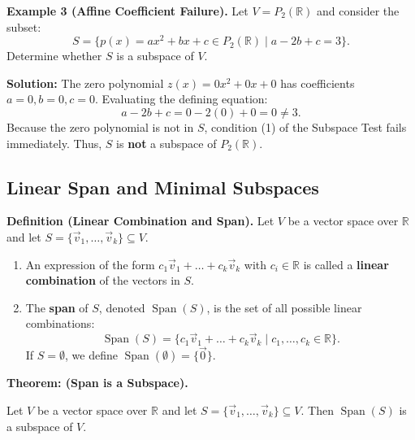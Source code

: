 \medskip
\noindent\textbf{Example 3 (Affine Coefficient Failure).} 
Let $V = P_2(\mathbb{R})$ and consider the subset:
\[
S = \{ p(x) = ax^2 + bx + c \in P_2(\mathbb{R}) \mid a - 2b + c = 3 \}.
\]
Determine whether $S$ is a subspace of $V$.

\medskip
\noindent\textbf{Solution:} 
The zero polynomial $z(x) = 0x^2 + 0x + 0$ has coefficients $a = 0, b = 0, c = 0$. Evaluating the defining equation:
\[
a - 2b + c = 0 - 2(0) + 0 = 0 \neq 3.
\]
Because the zero polynomial is not in $S$, condition (1) of the Subspace Test fails immediately. Thus, $S$ is \textbf{not} a subspace of $P_2(\mathbb{R})$.


\subsection{Linear Span and Minimal Subspaces}

\noindent\textbf{Definition (Linear Combination and Span).} 
Let $V$ be a vector space over $\mathbb{R}$ and let $S = \{\vec{v}_1, \dots, \vec{v}_k\} \subseteq V$. 
\begin{enumerate}[itemsep=0.8em, topsep=0.5em]
    \item An expression of the form $c_1\vec{v}_1 + \dots + c_k\vec{v}_k$ with $c_i \in \mathbb{R}$ is called a \textbf{linear combination} of the vectors in $S$.
    \item The \textbf{span} of $S$, denoted $\operatorname{Span}(S)$, is the set of all possible linear combinations:
    \[
    \operatorname{Span}(S) = \{ c_1\vec{v}_1 + \dots + c_k\vec{v}_k \mid c_1, \dots, c_k \in \mathbb{R} \}.
    \]
    If $S = \emptyset$, we define $\operatorname{Span}(\emptyset) = \{\vec{0}\}$.
\end{enumerate}

\medskip

\noindent\textbf{Theorem: (Span is a Subspace).}

Let $V$ be a vector space over $\mathbb{R}$ and let $S = \{\vec{v}_1, \dots, \vec{v}_k\} \subseteq V$. Then $\operatorname{Span}(S)$ is a subspace of $V$.

